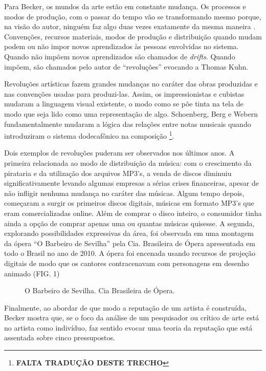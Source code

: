 \documentclass[a4paper, 12pt, openright, oneside, german, french, english, brazil]{abntex2}
\begin{document}
	Para Becker, os mundos da arte estão em constante mudança. Os processos e modos de produção, com o passar do tempo vão se transformando mesmo porque, na visão do autor, ninguém faz algo duas vezes exatamente da mesma maneira \cite[p. 301]{becker2008art}. Convenções, recursos materiais, modos de produção e distribuição quando mudam podem ou não impor novos aprendizados às pessoas envolvidas no sistema. Quando não impõem novos aprendizados são chamados de \textit{drifts}. Quando impõem, são chamados pelo autor de ``revoluções'' evocando a Thomas Kuhn.
	
	\begin{citacao}
		Revoluções artísticas fazem grandes mudanças no caráter das obras produzidas e nas convenções usadas para produzi-las. Assim, os impressionistas e cubistas mudaram a linguagem visual existente, o modo como se põe tinta na tela de modo que seja lido como uma representação de algo. Schoenberg, Berg e Webern fundamentalmente mudaram a lógica das relações entre notas musicais quando introduziram o sistema dodecafônico na composição \footnote{\textbf{FALTA TRADUÇÃO DESTE TRECHO}}.\cite[p. 305]{becker2008art}
	\end{citacao}
	
	Dois exemplos de revoluções puderam ser observados nos últimos anos. A primeira relacionada ao modo de distribuição da música: com o crescimento da pirataria e da utilização dos arquivos MP3's, a venda de discos diminuiu significativamente levando algumas empresas a sérias crises financeiras, apesar de não infligir nenhuma mudança no caráter das músicas. Algum tempo depois, começaram a surgir os primeiros discos digitais, músicas em formato MP3's que eram comercializadas online. Além de comprar o disco inteiro, o consumidor tinha ainda a opção de comprar apenas uma ou quantas músicas quisesse. A segunda, explorando possibilidades expressivas da área, foi observada em uma montagem da ópera ``O Barbeiro de Sevilha'' pela Cia. Brasileira de Ópera apresentada em todo o Brasil no ano de 2010. A ópera foi encenada usando recursos de projeção digitais de modo que os cantores contracenavam com personagens em desenho animado (FIG. 1)
	
	\begin{figure}[h]
		\centering
		\caption{O Barbeiro de Sevilha. Cia Brasileira de Ópera.}
	\end{figure}
	
	Finalmente, ao abordar de que modo a reputação de um artista é construída, Becker mostra que, se o foco da análise de um pesquisador ou crítico de arte está no artista como indivíduo, faz sentido evocar uma teoria da reputação que está assentada sobre cinco pressupostos.
	
\end{document}
